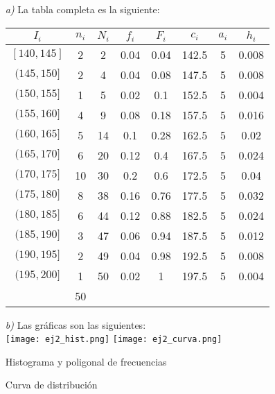 \documentclass[11pt,a4paper]{article}
\theoremstyle{definition}
\begin{document}
\begin{itemize}
	\item[\emph{a)}] La tabla completa es la siguiente:

\begin{table}[!htbp]
\hspace*{2 cm}
\begin{tabular}{|c|c|c|c|c|c|c|c|}
\multicolumn{1}{c|}{$I_i$} & $n_i$ & $N_i$ & $f_i$ & $F_i$ & $c_i$ & $a_i$ & $h_i$ \\ \hline
$[140, 145]$ &  2	&  2	& 0.04	& 0.04 & 142.5 & 5 & 0.008 \\
$(145, 150]$ &  2	&  4	& 0.04	& 0.08	& 147.5	& 5 & 0.008\\
$(150, 155]$ &  1	&  5	& 0.02	& 0.1	& 152.5	& 5 & 0.004\\
$(155, 160]$ &  4	&  9	& 0.08	& 0.18	& 157.5	& 5 & 0.016\\
$(160, 165]$ &  5	& 14	& 0.1	& 0.28	& 162.5	& 5 & 0.02\\
$(165, 170]$ &  6	& 20	& 0.12	& 0.4	& 167.5 & 5 & 0.024	\\
$(170, 175]$ & 10	& 30	& 0.2	& 0.6 & 172.5 & 5 & 0.04 \\
$(175, 180]$ &  8	& 38	& 0.16	& 0.76 & 177.5 & 5 & 0.032 \\
$(180, 185]$ &  6	& 44	& 0.12	& 0.88 & 182.5 & 5 & 0.024 \\
$(185, 190]$ &  3	& 47	& 0.06	& 0.94 & 187.5 & 5 & 0.012 \\
$(190, 195]$ &  2	& 49	& 0.04	& 0.98 & 192.5 & 5 & 0.008 \\
$(195, 200]$ &  1	& 50	& 0.02	& 1 & 197.5 & 5 & 0.004 \\ \hline
\multicolumn{1}{c}{} & \multicolumn{1}{|c|}{50} & \multicolumn{1}{c}{} & \multicolumn{1}{c}{} & \multicolumn{1}{c}{} \\ \cline{2-2}
\end{tabular}
\end{table}

	\item[\emph{b)}] Las gráficas son las siguientes: \\
	
	
\hspace{0.5cm} \texttt{[image: ej2\_hist.png]} \hspace{0.5cm} \texttt{[image: ej2\_curva.png]}

\begin{multicols}{2}
\begin{center}
\small{Histograma y poligonal de frecuencias} \\
\end{center}
\begin{center}
\small{Curva de distribución}
\end{center}
\end{multicols}
\end{itemize}
\hspace{2cm} \\
\end{document}
